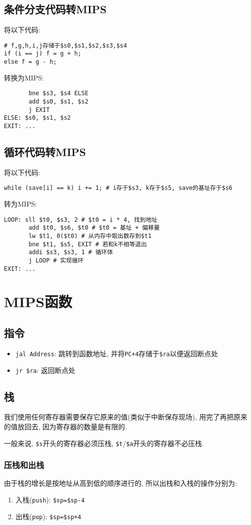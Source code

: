 \subsection{条件分支代码转MIPS}
将以下代码:
\begin{lstlisting}
# f,g,h,i,j存储于$s0,$s1,$s2,$s3,$s4
if (i == j) f = g + h;
else f = g - h;
\end{lstlisting}\par
转换为MIPS:
\begin{lstlisting}
       bne $s3, $s4 ELSE
       add $s0, $s1, $s2
       j EXIT
ELSE: $s0, $s1, $s2
EXIT: ...
\end{lstlisting}
\subsection{循环代码转MIPS}
将以下代码:
\begin{lstlisting}
while (save[i] == k) i += 1; # i存于$s3, k存于$s5, save的基址存于$s6
\end{lstlisting}\par
转为MIPS:
\begin{lstlisting}
LOOP: sll $t0, $s3, 2 # $t0 = i * 4, 找到地址
       add $t0, $s6, $t0 # $t0 = 基址 + 偏移量
       lw $t1, 0($t0) # 从内存中取出数存到$t1
       bne $t1, $s5, EXIT # 若和k不相等退出
       addi $s3, $s3, 1 # 循环体
       j LOOP # 实现循环
EXIT: ...
\end{lstlisting}
\section{MIPS函数}
\subsection{指令}
\begin{itemize}
\item \verb|jal Address|: 跳转到函数地址, 并将\verb|PC+4|存储于\verb|$ra|以便返回断点处
\item \verb|jr $ra|: 返回断点处
\end{itemize}
\subsection{栈}
我们使用任何寄存器需要保存它原来的值(类似于中断保存现场), 用完了再把原来的值放回去, 因为寄存器的数量是有限的. \par 
一般来说, \verb|$s|开头的寄存器必须压栈, \verb|$t|/\verb|$a|开头的寄存器不必压栈.
\subsubsection{压栈和出栈}
由于栈的增长是按地址从高到低的顺序进行的, 所以出栈和入栈的操作分别为:
\begin{enumerate}
\item 入栈(\verb|push|): \verb|$sp=$sp-4|
\item 出栈(\verb|pop|): \verb|$sp=$sp+4|
\end{enumerate}
